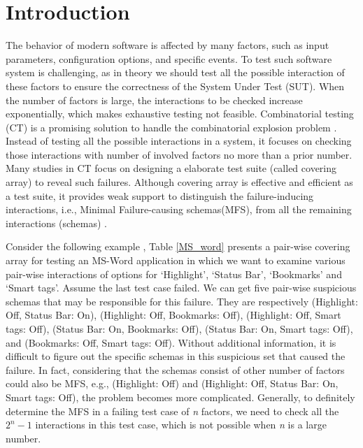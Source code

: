 \section{Introduction}\label{sec:intro}

The behavior of modern software is affected by many factors, such as input parameters, configuration options, and specific events. To test such software system is challenging, as in theory we should test all the possible interaction of these factors to ensure the correctness of the System Under Test (SUT)\cite{song2012itree}. When the number of factors is large, the interactions to be checked increase exponentially, which makes exhaustive testing not feasible. Combinatorial testing (CT) is a promising solution to handle the combinatorial explosion problem \cite{kuhn2002investigation,kuhn2004software}. Instead of testing all the possible interactions in a system, it focuses on checking those interactions with number of involved factors no more than a prior number. Many studies in CT focus on designing a elaborate test suite (called covering array) to reveal such failures. Although covering array is effective and efficient as a test suite, it provides weak support to distinguish the failure-inducing interactions, i.e., Minimal Failure-causing schemas(MFS), from all the remaining interactions (schemas) \cite{colbourn2008locating,martinez2008algorithms}.


Consider the following example \cite{bach2004pairwise}, Table \ref{MS_word} presents a pair-wise covering array for testing an MS-Word application in which we want to examine various pair-wise interactions of options for `Highlight', `Status Bar', `Bookmarks' and `Smart tags'. Assume the last test case failed. We can get five pair-wise suspicious schemas that may be responsible for this failure. They are respectively (Highlight: Off, Status Bar: On), (Highlight: Off, Bookmarks: Off), (Highlight: Off, Smart tags: Off), (Status Bar: On, Bookmarks: Off), (Status Bar: On, Smart tags: Off),  and (Bookmarks: Off, Smart tags: Off). Without additional information, it is difficult to figure out the specific schemas in this suspicious set that caused the failure. In fact, considering that the schemas consist of other number of factors could also be MFS, e.g., (Highlight: Off) and (Highlight: Off, Status Bar: On, Smart tags: Off), the problem becomes more complicated. Generally, to definitely determine the MFS in a failing test case of \emph{n} factors, we need to check all the $2^n - 1$ interactions in this test case, which is not possible when \emph{n} is a large number.

